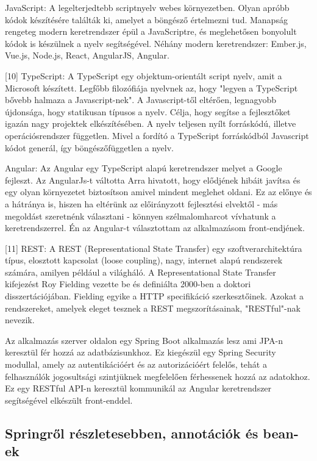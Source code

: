 JavaScript: A legelterjedtebb scriptnyelv webes környezetben. Olyan apróbb kódok készítésére találták ki, amelyet a böngésző értelmezni tud. Manapság rengeteg modern keretrendszer épül a JavaScriptre, és meglehetősen bonyolult kódok is készülnek a nyelv segítségével. Néhány modern keretrendszer: Ember.js, Vue.js, Node.js, React, AngularJS, Angular.

[10] TypeScript: A TypeScript egy objektum-orientált script nyelv, amit a Microsoft készített. Legfőbb filozófiája nyelvnek az, hogy "legyen a TypeScript bővebb halmaza a Javascript-nek". A Javascript-től eltérően, legnagyobb újdonsága, hogy statikusan típusos a nyelv. Célja, hogy segítse a fejlesztőket igazán nagy projektek elkészítésében. A nyelv teljesen nyílt forráskódú, illetve operációsrendszer független. Mivel a fordító a TypeScript forráskódból Javascript kódot generál, így böngészőfüggetlen a nyelv.

Angular: Az Angular egy TypeScript alapú keretrendszer melyet a Google fejleszt. Az AngularJs-t váltotta Arra hivatott, hogy elődjének hibáit javítsa és egy olyan környezetet biztosítson amivel mindent meglehet oldani. Ez az előnye és a hátránya is, hiszen ha eltérünk az előirányzott fejlesztési elvektől - más megoldást szeretnénk választani - könnyen szélmalomharcot vívhatunk a keretrendszerrel. Én az Angular-t választottam az alkalmazásom front-endjének.

[11] REST: A REST (Representational State Transfer) egy szoftverarchitektúra típus, elosztott kapcsolat (loose coupling), nagy, internet alapú rendszerek számára, amilyen például a világháló. A Representational State Transfer kifejezést Roy Fielding vezette be és definiálta 2000-ben a doktori disszertációjában. Fielding egyike a HTTP specifikáció szerkesztőinek.
Azokat a rendszereket, amelyek eleget tesznek a REST megszorításainak, "RESTful"-nak nevezik.

Az alkalmazás szerver oldalon egy Spring Boot alkalmazás lesz ami JPA-n keresztül fér hozzá az adatbázisunkhoz. Ez kiegészül egy Spring Security modullal, amely az autentikációért és az autorizációért felelős, tehát  a felhasználók jogosultsági szintjüknek megfelelően férhessenek hozzá az adatokhoz. Ez egy RESTful API-n keresztül kommunikál az Angular keretrendszer segítségével elkészült front-enddel. 

\subsection{Springről részletesebben, annotációk és bean-ek}	%

